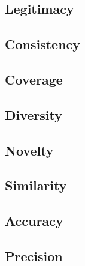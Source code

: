 \subsection{Legitimacy}


\subsection{Consistency}

\subsection{Coverage}
\subsection{Diversity}
\subsection{Novelty}

\subsection{Similarity}
\subsection{Accuracy}
\subsection{Precision}




